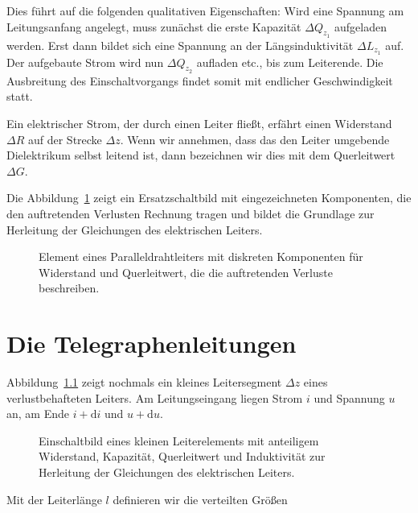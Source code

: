 \documentclass[paper=a4, parskip=half-, ngerman, fontsize=11pt]{scrreprt}
\begin{document}
Dies führt auf die folgenden qualitativen Eigenschaften: Wird eine Spannung am Leitungsanfang angelegt, muss zunächst
die erste Kapazität $\Delta Q_{z_{1}}$ aufgeladen werden. Erst dann bildet sich eine Spannung an der Längsinduktivität
$\Delta L_{z_{1}}$ auf. Der aufgebaute Strom wird nun $\Delta Q_{z_{2}}$ aufladen etc., bis zum Leiterende. Die
Ausbreitung des Einschaltvorgangs findet somit mit endlicher Geschwindigkeit statt.

Ein elektrischer Strom, der durch einen Leiter fließt, erfährt einen Widerstand $\Delta R$ auf der Strecke
$\Delta z$. Wenn wir annehmen, dass das den Leiter umgebende Dielektrikum selbst leitend ist, dann bezeichnen wir
dies mit dem Querleitwert $\Delta G$.

Die Abbildung~\ref{Leitung3} zeigt ein Ersatzschaltbild mit eingezeichneten Komponenten, die den auftretenden Verlusten
Rechnung tragen und bildet die Grundlage zur Herleitung der Gleichungen des elektrischen Leiters.

\begin{figure}[!htb]
    \begin{center}
        
        \caption{Element eines Paralleldrahtleiters mit diskreten Komponenten für Widerstand und Querleitwert, die die
        auftretenden Verluste beschreiben.}
        \label{Leitung3}
    \end{center}
\end{figure}



\chapter{Die Telegraphenleitungen}
Abbildung~\ref{Leitung4} zeigt nochmals ein kleines Leitersegment $\Delta z$ eines verlustbehafteten Leiters. Am
Leitungseingang liegen Strom $i$ und Spannung $u$ an, am Ende \mbox{$i + \mathrm{d} i$} und
\mbox{$u + \mathrm{d} u$}.
\begin{figure}[!htb]
    \begin{center}
        
        \caption{Einschaltbild eines kleinen Leiterelements mit anteiligem Widerstand, Kapazität, Querleitwert und
        Induktivität zur Herleitung der Gleichungen des elektrischen Leiters.}
        \label{Leitung4}
    \end{center}
\end{figure}

Mit der Leiterlänge $l$ definieren wir die verteilten Größen
\end{document}
